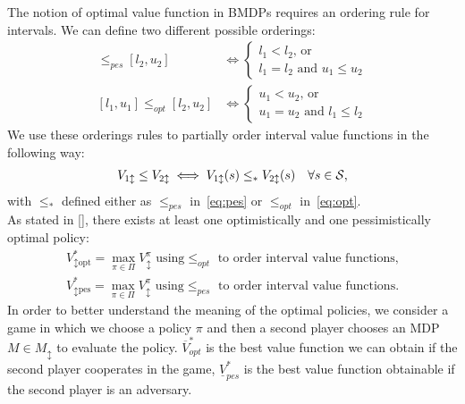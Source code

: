 \newline
The notion of optimal value function in \ac{BMDP}s requires an ordering rule for intervals. We can define two different possible orderings:
\begin{align}
[l_1, u_1] \leq_{pes} [l_2, u_2] &\Leftrightarrow 
\begin{cases}
l_1 < l_2 \text{, or }\\
l_1 = l_2 \text{ and } u_1 \leq u_2
\end{cases} \label{eq:pes}\\
[l_1, u_1] \leq_{opt} [l_2, u_2] &\Leftrightarrow 
\begin{cases}
u_1 < u_2 \text{, or }\\
u_1 = u_2 \text{ and } l_1 \leq l_2
\end{cases} \label{eq:opt}
\end{align}
We use these orderings rules to partially order interval value functions in the following way:
\begin{align} V_{1 \updownarrow} \leq V_{2 \updownarrow} \iff V_{1 \updownarrow}(s) \leq_{*} V_{2 \updownarrow}(s) \quad \forall s \in \mathcal{S}, \end{align}
with $\leq_{*}$ defined either as $\leq_{pes}$ in~\eqref{eq:pes} or $\leq_{opt}$ in~\eqref{eq:opt}.\\
\newline
As stated in [\cite{givan2000bounded}], there exists at least one optimistically and one pessimistically optimal policy:
\begin{align*}
V^{*}_{\updownarrow \text{opt}} = \max_{\pi \in \Pi} V_{\updownarrow}^{\pi} \text{ using} \leq_{opt} \text{ to order interval value functions,}\\
V^{*}_{\updownarrow \text{pes}} = \max_{\pi \in \Pi} V_{\updownarrow}^{\pi} \text{ using} \leq_{pes} \text{ to order interval value functions.}
\end{align*}
In order to better understand the meaning of the optimal policies, we consider a game in which we choose a policy $\pi$ and then a second player chooses an \ac{MDP} $M \in M_{\updownarrow}$ to evaluate the policy. $\overline{V}^{*}_{opt}$ is the best value function we can obtain if the second player cooperates in the game, $\underline{V}^{*}_{pes}$ is the best value function obtainable if the second player is an adversary.
